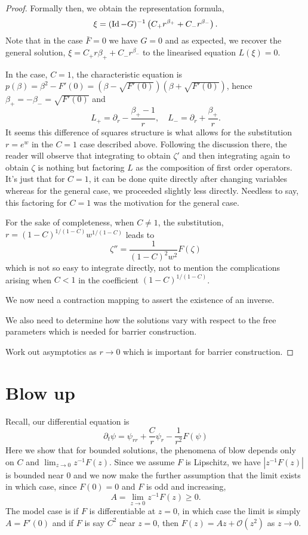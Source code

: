 \documentclass{amsart}
\begin{document}
\begin{proof}
Formally then, we obtain the representation formula,
\[
\xi = (\operatorname{Id} - G)^{-1} \left(C_+ r^{\beta_+} + C_- r^{\beta_-}\right).
\]
Note that in the case \(\bar{F} = 0\) we have \(G = 0\) and as expected, we recover the general solution, \(\xi = C_+ r{\beta_+} + C_- r^{\beta_-}\) to the linearised equation \(L(\xi) = 0\).

\begin{rem}
In the case, \(C = 1\), the characteristic equation is \(p(\beta) = \beta^2 - F'(0) = (\beta - \sqrt{F'(0)})(\beta + \sqrt{F'(0)})\), hence \(\beta_+ = -\beta_- = \sqrt{F'(0)}\) and
\[
L_+ = \partial_r - \frac{\beta_+ - 1}{r}, \quad L_- = \partial_r + \frac{\beta_+}{r}.
\]
It seems this difference of squares structure is what allows for the substitution \(r = e^w\) in the \(C=1\) case described above. Following the discussion there, the reader will observe that integrating to obtain \(\zeta'\) and then integrating again to obtain \(\zeta\) is nothing but factoring \(L\) as the composition of first order operators. It's just that for \(C = 1\), it can be done quite directly after changing variables whereas for the general case, we proceeded slightly less directly. Needless to say, this factoring for \(C = 1\) was the motivation for the general case.

For the sake of completeness, when \(C \ne 1\), the substitution, \(r = (1-C)^{1/(1-C)} w^{1/(1-C)}\) leads to
\[
\zeta'' = \frac{1}{(1-C)^2 w^2} F(\zeta)
\]
which is not so easy to integrate directly, not to mention the complications arising when \(C < 1\) in the coefficient \((1 - C)^{1/(1 - C)}\).
\end{rem}

{\color{red} We now need a contraction mapping to assert the existence of an inverse}.

{\color{red}We also need to determine how the solutions vary with respect to the free parameters which is needed for barrier construction}.

{\color{red}Work out asymptotics as \(r\to 0\) which is important for barrier construction}.
\end{proof}

\section{Blow up}

Recall, our differential equation is
\[
\partial_t \psi = \psi_{rr} + \frac{C}{r} \psi_r - \frac{1}{r^2} F(\psi)
\]
Here we show that for bounded solutions, the phenomena of blow depends only on \(C\) and \(\lim_{z\to 0} z^{-1} F(z)\). Since we assume \(F\) is Lipschitz, we have \(|z^{-1} F(z)|\) is bounded near \(0\) and we now make the further assumption that the limit exists in which case, since \(F(0) = 0\) and \(F\) is odd and increasing,
\[
A = \lim_{z\to 0} z^{-1} F(z) \geq 0.
\]
The model case is if \(F\) is differentiable at \(z=0\), in which case the limit is simply \(A = F'(0)\) and if \(F\) is say \(C^2\) near \(z=0\), then \(F(z) = Az + \mathcal{O} (z^2)\) as \(z \to 0\).
\end{document}
